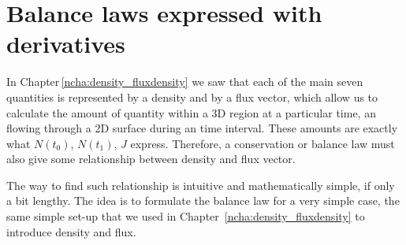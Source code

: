 \documentclass[a4paper,12pt,%
onecolumn,oneside,titlepage,%
british%
]{memoir}
\renewcommand*{\|}[1][]{\nonscript\:#1\vert\nonscript\:\mathopen{}}
\newcommand*{\chap}{Chapter}%
\newcommand*{\yN}{N}
\newcommand*{\yJ}{J}
\newcommand*{\yti}{t_{0}}
\newcommand*{\ytf}{t_{1}}
\begin{document}



\section{Balance laws expressed with derivatives}
\label{nsec:balance_derivative}

In \chap\,\ref{ncha:density_fluxdensity} we saw that each of the main seven quantities is represented by a density and by a flux vector, which allow us to calculate the amount of quantity within a 3D region at a particular time, an flowing through a 2D surface during an time interval. These amounts are exactly what $\yN(\yti)$, $\yN(\ytf)$, $\yJ$ express. Therefore, a conservation or balance law must also give some relationship between density and flux vector.

The way to find such relationship is intuitive and mathematically simple, if only a bit lengthy. The idea is to formulate the balance law for a very simple case, the same simple set-up that we used in \chap~\ref{ncha:density_fluxdensity} to introduce density and flux.
\end{document}
